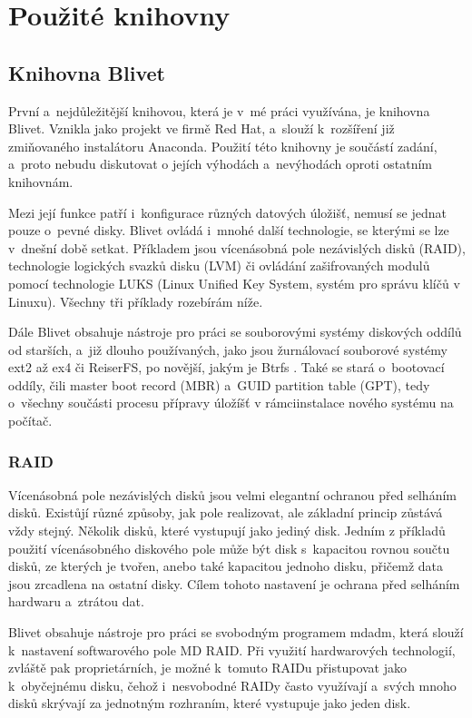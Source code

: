 \documentclass[color,table,oneside,nolot,nolof]{fithesis}
\begin{document}
\chapter{Použité knihovny}
\section{Knihovna Blivet}
	První a~nejdůležitější knihovou, která je v~mé práci využívána, je knihovna Blivet. Vznikla jako projekt
	ve firmě Red Hat, a~slouží k~rozšíření již zmiňovaného instalátoru Anaconda. Použití této knihovny je součástí zadání, a~proto nebudu diskutovat o jejích výhodách a~nevýhodách oproti ostatním knihovnám. 

	Mezi její funkce patří i~konfigurace různých datových úložišť, nemusí se jednat pouze o~pevné disky.
	Blivet ovládá i~mnohé další technologie, se kterými se lze v~dnešní době setkat. Příkladem jsou vícenásobná pole nezávislých disků (RAID), technologie logických svazků disku (LVM) či 
	ovládání zašifrovaných modulů pomocí technologie LUKS (Linux Unified Key System, systém pro správu klíčů v Linuxu). Všechny tři příklady rozebírám níže.

	Dále Blivet obsahuje nástroje pro práci se souborovými systémy diskových oddílů od starších, a~již dlouho používaných, jako jsou žurnálovací souborové systémy ext2 až ex4 či ReiserFS, po novější,
	jakým je Btrfs . Také se stará o~bootovací oddíly, čili master boot record (MBR) a~GUID partition table (GPT), tedy o~všechny součásti procesu přípravy 
	úložíšť v rámciinstalace
	nového systému na počítač.

\subsection{RAID}
	Vícenásobná pole nezávislých disků jsou velmi elegantní ochranou před selháním disků. Existůjí různé způsoby, jak pole realizovat, ale základní princip zůstává vždy stejný. 
	Několik disků, které vystupují jako jediný disk. Jedním z příkladů použití vícenásobného diskového pole může být disk s~kapacitou rovnou součtu disků, ze kterých je tvořen, anebo také
	kapacitou jednoho disku, přičemž data jsou zrcadlena na ostatní disky. Cílem tohoto nastavení je ochrana před selháním hardwaru a~ztrátou dat. 
	
	Blivet obsahuje nástroje pro práci se svobodným programem mdadm, která slouží k~nastavení softwarového pole MD RAID. Při využití hardwarových technologií, zvláště pak proprietárních,
	je možné k~tomuto RAIDu přistupovat jako k~obyčejnému disku, čehož i~nesvobodné RAIDy často využívají a~svých mnoho disků skrývají za jednotným rozhraním, které vystupuje jako jeden
	disk. 
\end{document}
